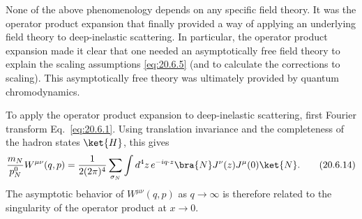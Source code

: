 None of the above phenomenology depends on any specific field theory. It was the operator product expansion that finally provided a way of applying an underlying field theory to deep-inelastic scattering. In particular, the operator product expansion made it clear that one needed an asymptotically free field theory to explain the scaling assumptions \eqref{eq:20.6.5} (and to calculate the corrections to scaling). This asymptotically free theory was ultimately provided by quantum chromodynamics.

To apply the operator product expansion to deep-inelastic scattering, first Fourier transform Eq.~\eqref{eq:20.6.1}. Using translation invariance and the completeness of the hadron states $\ket{H}$, this gives
\begin{equation}
\frac{m_N}{p_N^0}W^{\mu\nu}(q,p)
=\frac{1}{2(2\pi)^4}\sum_{\sigma_N}
\int d^4z\,e^{-iq\cdot z}
\bra{N}J^\nu(z)J^\mu(0)\ket{N}.
\tag{20.6.14}\label{eq:20.6.14}
\end{equation}
The asymptotic behavior of $W^{\mu\nu}(q,p)$ as $q\to\infty$ is therefore related to the singularity of the operator product at $x\to0$.

